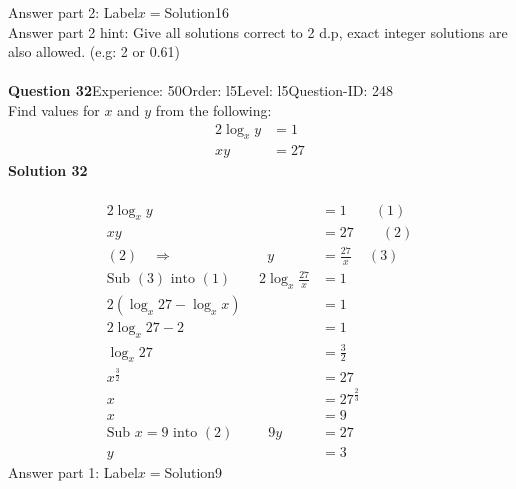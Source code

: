 \documentclass{article}
\begin{document}
Answer part 2: \hspace{10pt}Label\hspace{10pt}$x=$\hspace{10pt}Solution\hspace{10pt}16\\
Answer part 2 hint: \hspace{15pt}Give all solutions correct to 2 d.p, exact integer solutions are also allowed. (e.g: 2 or 0.61)\\
\\[4pt]
\noindent\textbf{Question 32}\hspace{20pt}Experience: 50\hspace{20pt}Order: l5\hspace{20pt}Level: l5\hspace{20pt}Question-ID: 248\\[2pt]
Find values for $x$ and $y$ from the following:
\begin{align*}
2\log_{x}y&=1\\[2pt]
xy&=27
\end{align*}
\noindent\textbf{Solution 32}\\[2pt]
\\[-35pt]\begin{align*}
2\log_{x}y&=1\qquad (1)\\[2pt]
xy&=27\qquad (2)\\[2pt]
(2) \quad\Rightarrow\hspace{80pt} y&=\displaystyle\frac{27}{x}\hspace{14pt} (3)\\[2pt]
\text{Sub}\,\,(3)\,\,\text{into}\,\,(1)\qquad 2\log_{x}\displaystyle\frac{27}{x}&=1\\[2pt]
2(\log_{x}27-\log_{x}x)&=1\\[2pt]
2\log_{x}27-2&=1\\[2pt]
\log_{x}27&=\displaystyle\frac{3}{2}\\[2pt]
x^{\frac{3}{2}}&=27\\[2pt]
x&=27^{\frac{2}{3}}\\[2pt]
x&=9\\[12pt]
\text{Sub}\,\,x=9\,\,\text{into}\,\,(2)\hspace{30pt}9y&=27\\[2pt]
y&=3
\end{align*}
Answer part 1: \hspace{10pt}Label\hspace{10pt}$x=$\hspace{10pt}Solution\hspace{10pt}9\\
\end{document}
